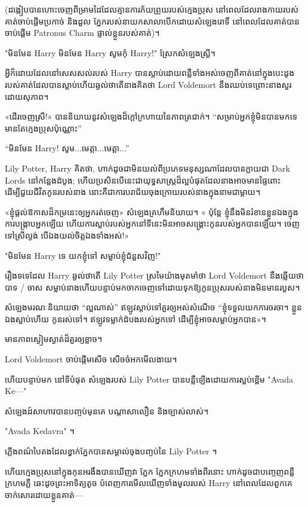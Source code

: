 (ដង្កៀបបានហោះចេញពីម្រាមដៃដែលគ្មានការភ័យព្រួយរបស់ក្មេងប្រុស នៅពេលដែលរាងកាយរបស់គាត់ចាប់ផ្តើមប្រកាច់ និងដួល ភ្នែករបស់នាយកសាលាបើកដោយសំឡេងរោទិ៍ នៅពេលដែលគាត់បានចាប់ផ្តើម Patronus Charm ផ្ទាល់ខ្លួនរបស់គាត់)។

\begin{em}
"មិនមែន Harry មិនមែន Harry សូមកុំ Harry!" ស្រែក​សំឡេង​ស្ត្រី។

អ្វីក៏ដោយដែលនៅសេសសល់របស់ Harry បានស្តាប់ដោយពន្លឺទាំងអស់ចេញពីគាត់នៅក្នុងបេះដូងរបស់គាត់ដែលបានស្លាប់ហើយឆ្ងល់ថាតើនាងគិតថា Lord Voldemort នឹងឈប់ទេព្រោះនាងសួរដោយសុភាព។

«ដើរចេញស្រី!» បាន​និយាយ​នូវ​សំឡេង​ដ៏​ក្ដៅ​ក្រហាយ​នៃ​ភាព​ត្រជាក់។ “សម្រាប់អ្នកខ្ញុំមិនបានមកទេ មានតែក្មេងប្រុសប៉ុណ្ណោះ”

“មិនមែន Harry! សូម...មេត្តា...មេត្តា...”

Lily Potter, Harry គិតថា, ហាក់ដូចជាមិនយល់ពីប្រភេទមនុស្សណាដែលបានក្លាយជា Dark Lords នៅកន្លែងដំបូង; ហើយប្រសិនបើនេះជាយុទ្ធសាស្ត្រដ៏ល្អបំផុតដែលនាងអាចមានផ្ទៃពោះដើម្បីជួយជីវិតកូនរបស់នាង នោះគឺជាការបរាជ័យចុងក្រោយរបស់នាងក្នុងនាមជាម្តាយ។

«ខ្ញុំ​ផ្ដល់​ឱកាស​ដ៏​កម្រ​នេះ​ឲ្យ​អ្នក​រត់​ចេញ» សំឡេង​គ្រហឹម​និយាយ។ « ប៉ុន្តែ ខ្ញុំ​នឹង​មិន​រំខាន​ខ្លួន​ឯង​ក្នុង​ការ​បង្ក្រាប​អ្នក​ឡើយ ហើយ​ការ​ស្លាប់​របស់​អ្នក​នៅ​ទី​នេះ​មិន​អាច​សង្គ្រោះ​កូន​របស់​អ្នក​បាន​ឡើយ។ ចេញ​ទៅ​ស្រី​ល្ងង់ បើ​ឯង​យល់​ចិត្ត​ឯង​ទាំង​អស់!»

"មិនមែន Harry ទេ យកខ្ញុំទៅ សម្លាប់ខ្ញុំជំនួសវិញ!"

រឿងទទេដែល Harry ឆ្ងល់ថាតើ Lily Potter ស្រមៃយ៉ាងមុតមាំថា Lord Voldemort នឹងឆ្លើយថាបាទ / ចាស សម្លាប់នាងហើយបន្ទាប់មកចាកចេញទៅដោយទុកឱ្យកូនប្រុសរបស់នាងមិនមានរបួស។

សំឡេង​មរណៈ​និយាយ​ថា “ល្អ​ណាស់” ឥឡូវ​ស្តាប់​ទៅ​គួរ​ឲ្យ​អស់​សំណើច “ខ្ញុំ​ទទួល​យក​ការ​ចរចា។ ខ្លួន​ឯង​ស្លាប់​ហើយ កូន​រស់​ទៅ។ ឥឡូវ​ទម្លាក់​ដំបង​របស់​អ្នក​ទៅ ដើម្បី​ខ្ញុំ​អាច​សម្លាប់​អ្នក​បាន»។

មាន​ភាព​ស្ងៀមស្ងាត់​ដ៏​គួរ​ឲ្យ​ខ្លាច។

Lord Voldemort ចាប់ផ្តើមសើច សើចចំអកមើលងាយ។

ហើយបន្ទាប់មក នៅទីបំផុត សំឡេងរបស់ Lily Potter បានបន្លឺឡើងដោយការស្អប់ខ្ពើម "Avada Ke—"

សំឡេងដ៍សាហាវបានបញ្ចប់មុនគេ បណ្តាសាលឿន និងច្បាស់លាស់។

"Avada Kedavra" ។

ភ្លើងពណ៌បៃតងដែលខ្វាក់ភ្នែកបានសម្គាល់ចុងបញ្ចប់នៃ Lily Potter ។

ហើយក្មេងប្រុសនៅក្នុងកុនអរងឹងបានឃើញវា ភ្នែក ភ្នែកក្រហមទាំងពីរនោះ ហាក់ដូចជាបញ្ចេញពន្លឺក្រហមភ្លឺ ឆេះដូចព្រះអាទិត្យតូច បំពេញការមើលឃើញទាំងមូលរបស់ Harry នៅពេលដែលពួកគេចាក់សោរដោយខ្លួនគាត់—
\end{em}


